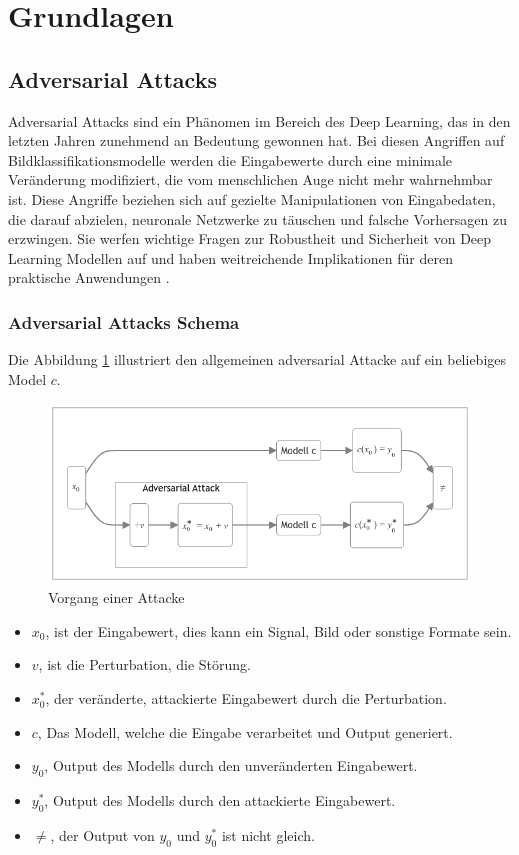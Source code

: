 \section{Grundlagen} 
\subsection{Adversarial Attacks}

Adversarial Attacks sind ein Phänomen im Bereich des Deep Learning, das in den letzten Jahren zunehmend an Bedeutung gewonnen hat. Bei diesen Angriffen auf Bildklassifikationsmodelle werden die Eingabewerte durch eine minimale Veränderung modifiziert, die vom menschlichen Auge nicht mehr wahrnehmbar ist. Diese Angriffe beziehen sich auf gezielte Manipulationen von Eingabedaten, die darauf abzielen, neuronale Netzwerke zu täuschen und falsche Vorhersagen zu erzwingen. Sie werfen wichtige Fragen zur Robustheit und Sicherheit von Deep Learning Modellen auf und haben weitreichende Implikationen für deren praktische Anwendungen \cite{goodfellow_explaining_2015}. 

\subsubsection{Adversarial Attacks Schema} 

Die Abbildung \ref{fig:grundlagen} illustriert den allgemeinen adversarial Attacke auf ein beliebiges Model $c$. 

\begin{figure}[H]
    \centering
    \includegraphics[width=0.8\linewidth]{01-images/02-grundlagen/adversarial-attack.png}
    \caption{Vorgang einer Attacke}
    \label{fig:grundlagen}
\end{figure}

\begin{itemize}
    \item $x_0$, ist der Eingabewert, dies kann ein Signal, Bild oder sonstige Formate sein.
    \item $v$, ist die Perturbation, die Störung.
    \item $x_0^{*}$, der veränderte, attackierte Eingabewert durch die Perturbation.
    \item $c$, Das Modell, welche die Eingabe verarbeitet und Output generiert.
    \item $y_0$, Output des Modells durch den unveränderten Eingabewert.
    \item $y_0^{*}$, Output des Modells durch den attackierte Eingabewert.
    \item $\neq$, der Output von $y_0$ und $y_0^{*}$ ist nicht gleich.
\end{itemize}

